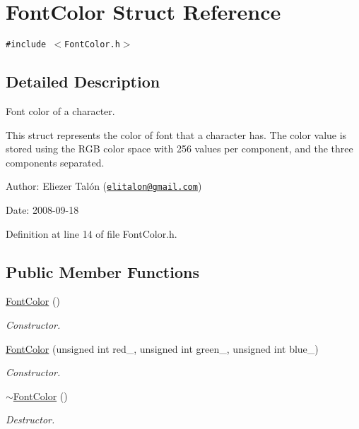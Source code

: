 \hypertarget{struct_font_color}{
\section{FontColor Struct Reference}
\label{struct_font_color}
}
{\tt \#include $<$FontColor.h$>$}



\subsection{Detailed Description}
Font color of a character. 

This struct represents the color of font that a character has. The color value is stored using the RGB color space with 256 values per component, and the three components separated.

\begin{Desc}
\item[Author:]Eliezer Talón (\href{mailto:elitalon@gmail.com}{\tt elitalon@gmail.com}) \end{Desc}
\begin{Desc}
\item[Date:]2008-09-18 \end{Desc}


Definition at line 14 of file FontColor.h.\subsection*{Public Member Functions}
\begin{CompactItemize}
\item 
\hyperlink{struct_font_color_c96e70b5ab153ea18d1e3196f79da1ab}{FontColor} ()
\begin{CompactList}\small\item\em Constructor. \item\end{CompactList}\item 
\hyperlink{struct_font_color_7ed65a063287bfa5ba792bd4d85c1b51}{FontColor} (unsigned int red\_\-, unsigned int green\_\-, unsigned int blue\_\-)
\begin{CompactList}\small\item\em Constructor. \item\end{CompactList}\item 
\hyperlink{struct_font_color_660917a7d04fdf47910573165f67cdaa}{$\sim$FontColor} ()
\begin{CompactList}\small\item\em Destructor. \item\end{CompactList}\end{CompactItemize}
